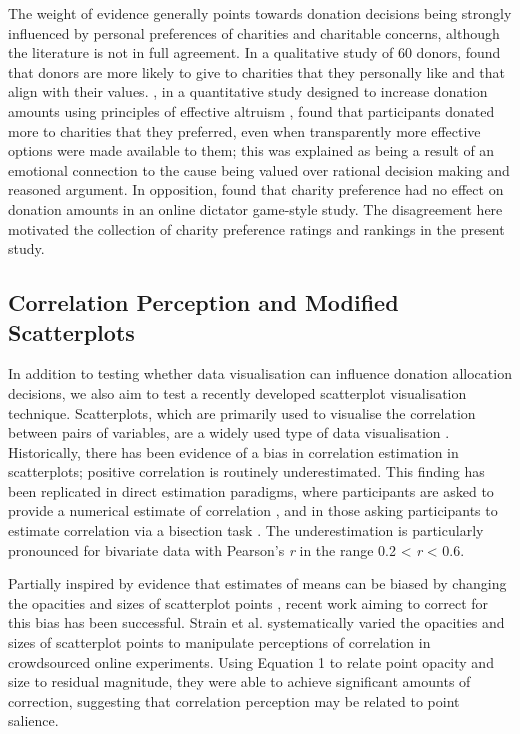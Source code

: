 \documentclass[
  authoryear,
  preprint,
  3p]{elsarticle}
\begin{document}
The weight of evidence generally points towards donation decisions being
strongly influenced by personal preferences of charities and charitable
concerns, although the literature is not in full agreement. In a
qualitative study of 60 donors, \citet{breeze_2013} found that donors
are more likely to give to charities that they personally like and that
align with their values. \citet{berman_2018}, in a quantitative study
designed to increase donation amounts using principles of effective
altruism \citep{macaskill_2019}, found that participants donated more to
charities that they preferred, even when transparently more effective
options were made available to them; this was explained as being a
result of an emotional connection to the cause being valued over
rational decision making and reasoned argument. In opposition,
\citet{she_2023} found that charity preference had no effect on donation
amounts in an online dictator game-style study. The disagreement here
motivated the collection of charity preference ratings and rankings in
the present study.

\subsection{Correlation Perception and Modified
Scatterplots}\label{sec-corr-percept}

In addition to testing whether data visualisation can influence donation
allocation decisions, we also aim to test a recently developed
scatterplot visualisation technique. Scatterplots, which are primarily
used to visualise the correlation between pairs of variables, are a
widely used type of data visualisation \citep{tufte_1983}. Historically,
there has been evidence of a bias in correlation estimation in
scatterplots; positive correlation is routinely underestimated. This
finding has been replicated in direct estimation paradigms, where
participants are asked to provide a numerical estimate of correlation
\citep{strahan_1978, bobko_1979, cleveland_1982, lane_1985, lauer_1989, collyer_1990, meyer_1992},
and in those asking participants to estimate correlation via a bisection
task \citep{rensink_2017}. The underestimation is particularly
pronounced for bivariate data with Pearson's \emph{r} in the range 0.2
\textless{} \emph{r} \textless{} 0.6.

Partially inspired by evidence that estimates of means can be biased by
changing the opacities and sizes of scatterplot points
\citep{hong_2022}, recent work aiming to correct for this bias has been
successful. Strain et al.
\citetext{\citeyear{strain_2023}; \citeyear{strain_2023a}; \citeyear{strain_2024}}
systematically varied the opacities and sizes of scatterplot points to
manipulate perceptions of correlation in crowdsourced online
experiments. Using Equation 1 to relate point opacity and size to
residual magnitude, they were able to achieve significant amounts of
correction, suggesting that correlation perception may be related to
point salience.
\end{document}
